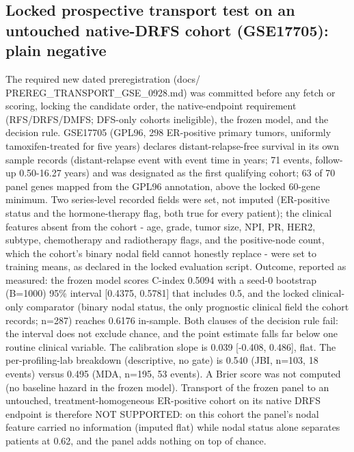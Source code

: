 \documentclass[12pt,a4paper]{article}
\begin{document}
\subsection{Locked prospective transport test on an untouched native-DRFS cohort (GSE17705): plain negative}
{\sloppy
The required new dated preregistration
(docs/ PREREG\_\allowbreak TRANSPORT\_\allowbreak GSE\_\allowbreak 0928.md) was committed before any
fetch or scoring, locking the candidate order, the native-endpoint requirement
(RFS/DRFS/DMFS; DFS-only cohorts ineligible), the frozen model, and the
decision rule. GSE17705 (GPL96, 298 ER-positive primary tumors, uniformly
tamoxifen-treated for five years) declares distant-relapse-free survival in
its own sample records (distant-relapse event with event time in years; 71
events, follow-up 0.50-16.27 years) and was designated as the first
qualifying cohort; 63 of 70 panel genes mapped from the GPL96 annotation,
above the locked 60-gene minimum. Two series-level recorded fields were set,
not imputed (ER-positive status and the hormone-therapy flag, both true for
every patient); the clinical features absent from the cohort - age, grade,
tumor size, NPI, PR, HER2, subtype, chemotherapy and radiotherapy flags, and
the positive-node count, which the cohort's binary nodal field cannot
honestly replace - were set to training means, as declared in the locked
evaluation script. Outcome, reported as measured: the frozen model scores
C-index 0.5094 with a seed-0 bootstrap (B=1000) 95\% interval
[0.4375, 0.5781] that includes 0.5, and the locked clinical-only comparator
(binary nodal status, the only prognostic clinical field the cohort records;
n=287) reaches 0.6176 in-sample. Both clauses of the decision rule fail: the
interval does not exclude chance, and the point estimate falls far below one
routine clinical variable. The calibration slope is 0.039 [-0.408, 0.486],
flat. The per-profiling-lab breakdown (descriptive, no gate) is 0.540 (JBI,
n=103, 18 events) versus 0.495 (MDA, n=195, 53 events). A Brier score was not
computed (no baseline hazard in the frozen model). Transport of the frozen
panel to an untouched, treatment-homogeneous ER-positive cohort on its native
DRFS endpoint is therefore NOT SUPPORTED: on this cohort the panel's nodal
feature carried no information (imputed flat) while nodal status alone
separates patients at 0.62, and the panel adds nothing on top of chance.
\par}
\end{document}
